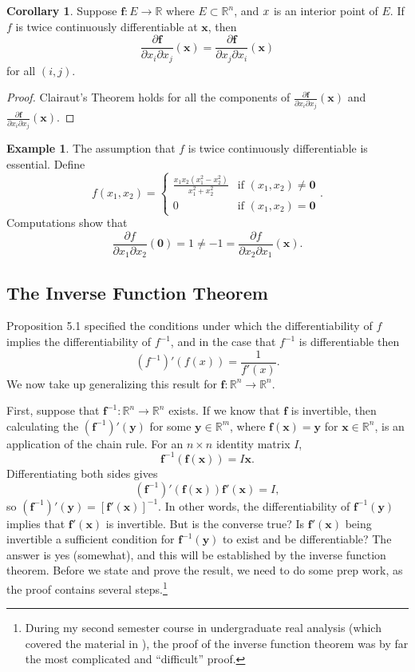 \documentclass{article}
\newcommand{\R}{\mathbb{R}}
\newcommand{\x}{\mathbf{x}}
\newcommand{\f}{\mathbf{f}}
\newcommand{\y}{\mathbf{y}}
\newcommand{\ze}{\mathbf{0}}
\theoremstyle{definition}
\newtheorem{corollary}{Corollary}[section]
\newtheorem{example}{Example}[section]
\begin{document}
	\begin{corollary}
		Suppose $ \f:E\to\R $ where $ E\subset \R^n $, and $ \mathbf \x$ is an interior point of $ E $. If $ f $ is twice continuously differentiable at $ \x $, then $$\frac{\partial \f}{\partial x_i\partial x_j}(\x) = \frac{\partial \f}{\partial x_j\partial x_i}(\x)$$ for all $ (i,j) $.  
	\end{corollary}
	\begin{proof}
		Clairaut's Theorem holds for all the components of $ \frac{\partial \f}{\partial x_i\partial x_j}(\x) $ and $\frac{\partial \f}{\partial x_i\partial x_j}(\x)$.
	\end{proof}
	\begin{example}
		The assumption that $ f $ is twice continuously differentiable is essential. Define 
		$$f(x_1,x_2)=\begin{cases}
			\frac{x_1x_2(x_1^2-x_2^2)}{x_1^2+x_2^2}&\text{if } (x_1,x_2)\neq \ze\\0&\text{if }(x_1,x_2) = \ze 
		\end{cases}.$$ Computations show that$$ \frac{\partial f}{\partial x_1\partial x_2}(\ze)= 1 \neq -1 = \frac{\partial f}{\partial x_2\partial x_1}(\x).$$
	\end{example}
	\subsection{The Inverse Function Theorem}
	Proposition 5.1 specified the conditions under which the differentiability of $ f $ implies the differentiability of $ f^{-1} $, and in the case that $ f^{-1} $ is differentiable then $$(f^{-1})'(f(x))=\frac{1}{f'(x)}.$$ We now take up generalizing this result for $ \f:\R^n\to\R^n $. 
	
	First, suppose that $ \f^{-1}:\R^n\to\R^n $ exists. If we know that $ \f $ is invertible, then calculating the $ (\f^{-1})'(\y) $ for some $ \y\in\R^m  $, where $ \f(\x)=\y $ for $ \x\in \R^n $, is an application of the chain rule. For an $ n\times n $ identity matrix $ I $, $$\f^{-1}(\f(\x)) = I\x .$$ 
	Differentiating both sides gives 
	$$ (\f^{-1})'(\f(\x))\f'(\x) = I ,$$
	so $ (\f^{-1})'(\y)=[\f'(\x)]^{-1}$. In other words, the differentiability of $ \f^{-1}(\y) $ implies that $ \f'(\x) $ is invertible. But is the converse true? Is $ \f'(\x) $ being invertible a sufficient condition for $ \f^{-1}(\y) $ to exist and be differentiable? The answer is yes (somewhat), and this will be established by the inverse function theorem. Before we state and prove the result, we need to do some prep work, as the proof contains several steps.\footnote{During my second semester course in undergraduate real analysis (which covered the material in \cite{tao2009analysis}), the proof of the inverse function theorem was by far the most complicated and ``difficult'' proof.}
	
\end{document}

